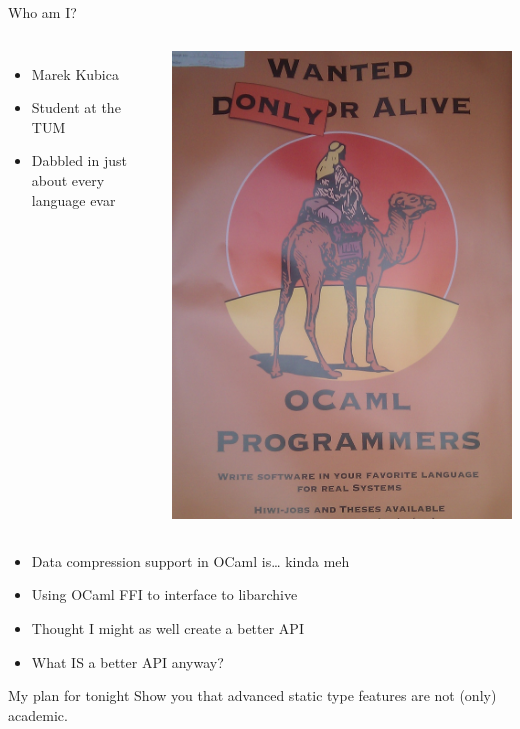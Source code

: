 \documentclass{beamer}
\begin{document}
\begin{frame}{Who am I?}
  \begin{columns}
      \begin{itemize}
        \item Marek Kubica
        \item Student at the TUM
        \item Dabbled in just about every language evar
      \end{itemize}
      \includegraphics[height=0.9\textheight]{poster}
  \end{columns}
\end{frame}

\begin{frame}
  \begin{itemize}
    \item Data compression support in OCaml is… kinda meh
    \item Using OCaml FFI to interface to libarchive
    \item Thought I might as well create a better API
    \item What IS a better API anyway?
  \end{itemize}
  \pause
  \begin{exampleblock}{My plan for tonight}
    Show you that advanced static type features are not (only) academic.
  \end{exampleblock}
\end{frame}
\end{document}
